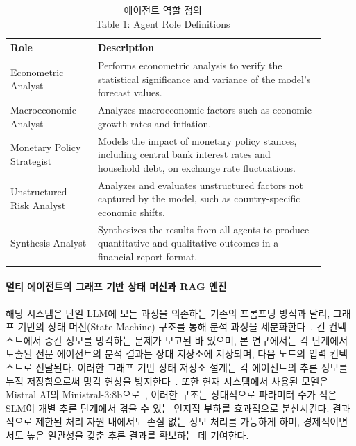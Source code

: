 \begin{table}[ht]
\centering
\caption{에이전트 역할 정의 \\ Table 1: Agent Role Definitions}
\label{tab:agents}
\small
\setlength{\tabcolsep}{6pt}
\renewcommand{\arraystretch}{1.2}
\begin{tabular}{>{\raggedright\arraybackslash}p{0.25\linewidth} >{\raggedright\arraybackslash}p{0.65\linewidth}}
\toprule
\textbf{Role} & \textbf{Description} \\
\midrule
Econometric Analyst & Performs econometric analysis to verify the statistical significance and variance of the model’s forecast values.\\ \addlinespace[3pt]
Macroeconomic Analyst & Analyzes macroeconomic factors such as economic growth rates and inflation.\\ \addlinespace[3pt]
Monetary Policy Strategist & Models the impact of monetary policy stances, including central bank interest rates and household debt, on exchange rate fluctuations.\\ \addlinespace[3pt]
Unstructured Risk Analyst & Analyzes and evaluates unstructured factors not captured by the model, such as country-specific economic shifts.\\ \addlinespace[3pt]
Synthesis Analyst & Synthesizes the results from all agents to produce quantitative and qualitative outcomes in a financial report format.\\
\bottomrule
\end{tabular}
\end{table}

\paragraph{멀티 에이전트의 그래프 기반 상태 머신과 RAG 엔진}
해당 시스템은 단일 LLM에 모든 과정을 의존하는 기존의 프롬프팅 방식과 달리, 그래프 기반의 상태 머신(State Machine) 구조를 통해 분석 과정을 세분화한다~\cite{Wu2024LangGraph}. 긴 컨텍스트에서 중간 정보를 망각하는 문제가 보고된 바 있으며\cite{Liu2024Lost}, 본 연구에서는 각 단계에서 도출된 전문 에이전트의 분석 결과는 상태 저장소에 저장되며, 다음 노드의 입력 컨텍스트로 전달된다. 이러한 그래프 기반 상태 저장소 설계는 각 에이전트의 추론 정보를 누적 저장함으로써 망각 현상을 방지한다~\cite{Packer2023MemGPT}. 또한 현재 시스템에서 사용된 모델은 Mistral AI의 Ministral-3:8b으로~\cite{Liu2026Ministral}, 이러한 구조는 상대적으로 파라미터 수가 적은 SLM이 개별 추론 단계에서 겪을 수 있는 인지적 부하를 효과적으로 분산시킨다. 결과적으로 제한된 처리 자원 내에서도 손실 없는 정보 처리를 가능하게 하며, 경제적이면서도 높은 일관성을 갖춘 추론 결과를 확보하는 데 기여한다.

